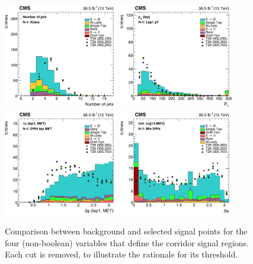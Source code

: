 \begin{figure}[htb]
\centering
\includegraphics[width=0.45\textwidth]{figures/nminus1_njets.pdf}
\includegraphics[width=0.45\textwidth]{figures/nminus1_ptlep.pdf}
\includegraphics[width=0.45\textwidth]{figures/nminus1_dphilmet.pdf}
\includegraphics[width=0.45\textwidth]{figures/nminus1_mindphi.pdf}
\caption{Comparison between background and selected signal points for
  the four (non-boolean) variables that define the corridor signal
  regions. Each cut is removed, to illustrate the rationale for its
  threshold.}
\label{fig:stop:corridor:nminusone}
\end{figure}

